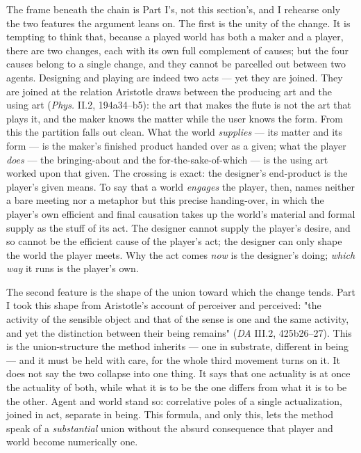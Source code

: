 \documentclass{article}
\begin{document}
The frame beneath the chain is Part I's, not this section's, and I rehearse only the two features the argument leans on. The first is the unity of the change. It is tempting to think that, because a played world has both a maker and a player, there are two changes, each with its own full complement of causes; but the four causes belong to a single change, and they cannot be parcelled out between two agents. Designing and playing are indeed two acts — yet they are joined. They are joined at the relation Aristotle draws between the producing art and the using art (\textit{Phys.} II.2, 194a34–b5): the art that makes the flute is not the art that plays it, and the maker knows the matter while the user knows the form. From this the partition falls out clean. What the world \textit{supplies} — its matter and its form — is the maker's finished product handed over as a given; what the player \textit{does} — the bringing-about and the for-the-sake-of-which — is the using art worked upon that given. The crossing is exact: the designer's end-product is the player's given means. To say that a world \textit{engages} the player, then, names neither a bare meeting nor a metaphor but this precise handing-over, in which the player's own efficient and final causation takes up the world's material and formal supply as the stuff of its act. The designer cannot supply the player's desire, and so cannot be the efficient cause of the player's act; the designer can only shape the world the player meets. Why the act comes \textit{now} is the designer's doing; \textit{which way} it runs is the player's own.

The second feature is the shape of the union toward which the change tends. Part I took this shape from Aristotle's account of perceiver and perceived: "the activity of the sensible object and that of the sense is one and the same activity, and yet the distinction between their being remains" (\textit{DA} III.2, 425b26–27). This is the union-structure the method inherits — one in substrate, different in being — and it must be held with care, for the whole third movement turns on it. It does not say the two collapse into one thing. It says that one actuality is at once the actuality of both, while what it is to be the one differs from what it is to be the other. Agent and world stand so: correlative poles of a single actualization, joined in act, separate in being. This formula, and only this, lets the method speak of a \textit{substantial} union without the absurd consequence that player and world become numerically one.
\end{document}
